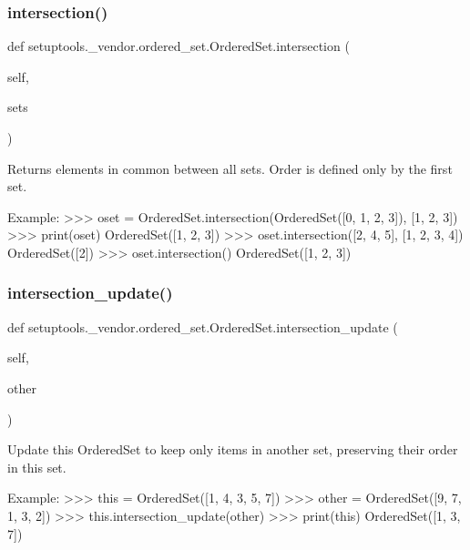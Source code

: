 \subsubsection{\texorpdfstring{intersection()}{intersection()}}
{\footnotesize\ttfamily def setuptools.\+\_\+vendor.\+ordered\+\_\+set.\+Ordered\+Set.\+intersection (\begin{DoxyParamCaption}\item[{}]{self,  }\item[{}]{sets }\end{DoxyParamCaption})}

\begin{DoxyVerb}Returns elements in common between all sets. Order is defined only
by the first set.

Example:
    >>> oset = OrderedSet.intersection(OrderedSet([0, 1, 2, 3]), [1, 2, 3])
    >>> print(oset)
    OrderedSet([1, 2, 3])
    >>> oset.intersection([2, 4, 5], [1, 2, 3, 4])
    OrderedSet([2])
    >>> oset.intersection()
    OrderedSet([1, 2, 3])
\end{DoxyVerb}
 \mbox{\label{classsetuptools_1_1__vendor_1_1ordered__set_1_1OrderedSet_aa74cb4ee0ea35a15b0e0db2f88d8b79d}} 
\subsubsection{\texorpdfstring{intersection\+\_\+update()}{intersection\_update()}}
{\footnotesize\ttfamily def setuptools.\+\_\+vendor.\+ordered\+\_\+set.\+Ordered\+Set.\+intersection\+\_\+update (\begin{DoxyParamCaption}\item[{}]{self,  }\item[{}]{other }\end{DoxyParamCaption})}

\begin{DoxyVerb}Update this OrderedSet to keep only items in another set, preserving
their order in this set.

Example:
    >>> this = OrderedSet([1, 4, 3, 5, 7])
    >>> other = OrderedSet([9, 7, 1, 3, 2])
    >>> this.intersection_update(other)
    >>> print(this)
    OrderedSet([1, 3, 7])
\end{DoxyVerb}
 \mbox{\label{classsetuptools_1_1__vendor_1_1ordered__set_1_1OrderedSet_a8f65dc04159e7de8741fb31edf71956d}} 

